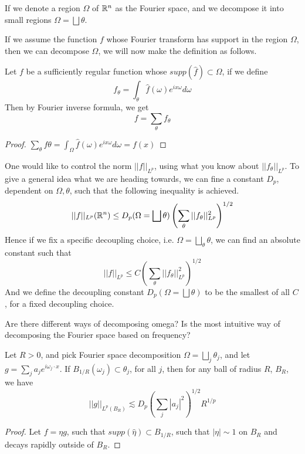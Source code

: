 If we denote a region $\Omega$ of $\mathbb{R}^n$ as the Fourier space, and we decompose it into small regions $\Omega=\bigsqcup\theta$.

If we assume the function $f$ whose Fourier transform has support in the region $\Omega$, then we can decompose $\Omega$, we will now make the definition as follows.
\begin{definition}[Decoupling]
    Let $f$ be a sufficiently regular function whose $supp(\widehat{f})\subset\Omega$, if we define
    \begin{equation*}
        f_\theta=\int_\theta\widehat{f}(\omega)e^{ix\omega}d\omega
    \end{equation*}
    Then by Fourier inverse formula, we get
    \begin{equation*}
        f=\sum_\theta f_\theta
    \end{equation*}
\end{definition}
\begin{proof}
    $\sum_\theta f\theta=\int_\Omega \widehat{f}(\omega)e^{ix\omega}d\omega=f(x)$
\end{proof}

One would like to control the norm $||f||_{L^p}$, using what you know about $||f_\theta||_{L^p}$. To give a general idea what we are heading towards, we can fine a constant $D_p$, dependent on $\Omega, \theta$, such that the following inequality is achieved.
\begin{equation*}
    ||f||_{L^p}(\mathbb{R}^n)\leq D_p(\Omega=\bigsqcup\theta)\left(\sum_\theta||f_\theta||_{L^p}^2\right)^{1/2}
\end{equation*}
Hence if we fix a specific decoupling choice, i.e. $\Omega=\bigsqcup_\theta\theta$, we can find an absolute constant such that
\begin{equation*}
    ||f||_{L^p}\leq C\left(\sum_\theta ||f_\theta||_{L^p}^2\right)^{1/2}
\end{equation*}
And we define the decoupling constant $D_p(\Omega=\bigsqcup\theta)$ to be the smallest of all $C$, for a fixed decoupling choice.



\begin{remark}
    Are there different ways of decomposing omega? Is the most intuitive way of decomposing the Fourier space based on frequency?
\end{remark}

\begin{proposition}
    Let $R>0$, and pick Fourier space decomposition $\Omega=\bigsqcup_j\theta_j$, and let $g=\sum_ja_je^{i\omega_j\cdot x}$. If $B_{1/R}(\omega_j)\subset\theta_j$, for all $j$, then for any ball of radius $R$, $B_R$, we have
    \begin{equation*}
        ||g||_{L^p(B_R)}\lesssim D_p\left(\sum_j|a_j|^2 \right)^{1/2}R^{1/p}
    \end{equation*}
\end{proposition}
\begin{proof}
    Let $f=\eta g$, such that $supp(\widehat{\eta})\subset B_{1/R}$, such that $|\eta|\sim 1$ on $B_R$ and decays rapidly outside of $B_R$.
\end{proof}

